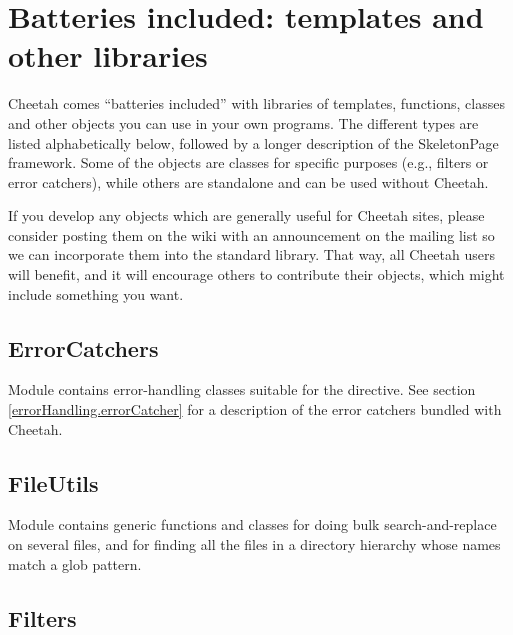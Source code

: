 \section{Batteries included: templates and other libraries}
\label{libraries}

Cheetah comes ``batteries included'' with libraries of templates, functions,
classes and other objects you can use in your own programs.  The different
types are listed alphabetically below, followed by a longer description of
the SkeletonPage framework.  Some of the objects are classes for specific
purposes (e.g., filters or error catchers), while others are standalone and
can be used without Cheetah.

If you develop any objects which are generally useful for Cheetah sites,
please consider posting them on the wiki with an announcement on the mailing
list so we can incorporate them into the standard library.  That way, all
Cheetah users will benefit, and it will encourage others to contribute their
objects, which might include something you want.

\subsection{ErrorCatchers}
\label{libraries.ErrorCatchers}

Module  contains error-handling classes
suitable for the  directive.
See section \ref{errorHandling.errorCatcher} for a description of the 
error catchers bundled with Cheetah.


\subsection{FileUtils}
\label{libraries.FileUtils}

Module  contains generic functions and classes for 
doing bulk search-and-replace on several files, and for finding all the files
in a directory hierarchy whose names match a glob pattern.

\subsection{Filters}
\label{libraries.Filters}

